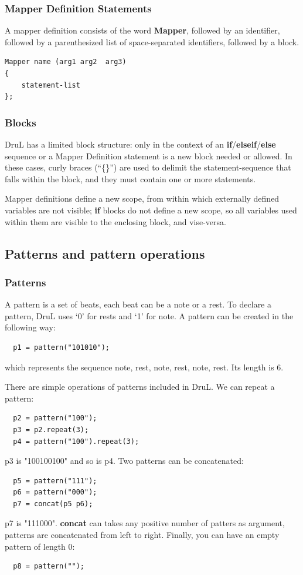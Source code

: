 \documentclass[11pt,twoside]{article}
\begin{document}
\subsubsection{Mapper Definition Statements}

A mapper definition consists of the word \textbf{Mapper}, followed by an identifier, followed by a parenthesized list of space-separated identifiers, followed by a block.

\begin{verbatim}
Mapper name (arg1 arg2  arg3)
{
    statement-list
};
\end{verbatim}

\subsubsection{Blocks}
DruL has a limited block structure: only in the context of an \textbf{if}/\textbf{elseif}/\textbf{else} sequence or a Mapper Definition statement is a new block needed or allowed.  In these cases, curly braces (``\{\}'') are used to delimit the statement-sequence that falls within the block, and they must contain one or more statements.

Mapper definitions define a new scope, from within which externally defined variables are not visible; \textbf{if} blocks do not define a new scope, so all variables used within them are visible to the enclosing  block, and vise-versa.

\subsection{Patterns and pattern operations}

\subsubsection{Patterns}
A pattern is a set of beats, each beat can be a note or a rest.
To declare a pattern, DruL uses `0' for rests and `1' for note.
A pattern can be created in the following way:
\begin{verbatim}
  p1 = pattern("101010");
\end{verbatim}
which represents the sequence {note, rest, note, rest, note, rest}.
Its length is $6$.

There are simple operations of patterns included in DruL. We
can repeat a pattern:
\begin{verbatim}
  p2 = pattern("100");
  p3 = p2.repeat(3);
  p4 = pattern("100").repeat(3);
\end{verbatim}
p3 is "100100100" and so is p4. Two patterns can be concatenated:
\begin{verbatim}
  p5 = pattern("111");
  p6 = pattern("000");
  p7 = concat(p5 p6);
\end{verbatim}
p7 is "111000". \textbf{concat} can takes any positive number of
patters as argument, patterns are concatenated from left to right.
Finally, you can have an empty pattern of length 0:
\begin{verbatim}
  p8 = pattern("");
\end{verbatim}
\end{document}
